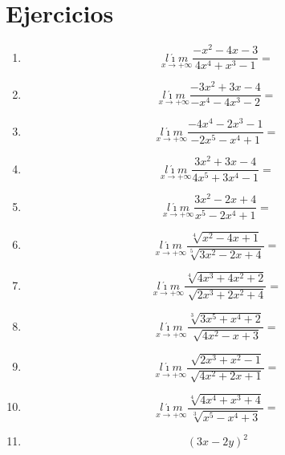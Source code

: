\documentclass[oneside,spanish,letter]{article}
\begin{document}
\section{Ejercicios}
\begin{enumerate}
 \item $$\underset{x\rightarrow +\infty}{l\acute{\imath}m} \frac{-x^2-4x-3}{4x^4+x^3-1}=$$
 \item $$\underset{x\rightarrow +\infty}{l\acute{\imath}m} \frac{-3x^2+3x-4}{-x^4-4x^3-2}=$$
 \item $$\underset{x\rightarrow +\infty}{l\acute{\imath}m} \frac{-4x^4-2x^3-1}{-2x^5-x^4+1}=$$
 \item $$\underset{x\rightarrow +\infty}{l\acute{\imath}m} \frac{3x^2+3x-4}{4x^5+3x^4-1}=$$
 \item $$\underset{x\rightarrow +\infty}{l\acute{\imath}m} \frac{3x^2-2x+4}{x^5-2x^4+1}=$$
 \item $$\underset{x\rightarrow +\infty}{l\acute{\imath}m} \frac{\sqrt[4]{x^2-4x+1}}{\sqrt[5]{3x^2-2x+4}}=$$
 \item $$\underset{x\rightarrow +\infty}{l\acute{\imath}m} \frac{\sqrt[4]{4x^3+4x^2+2}}{\sqrt[]{2x^3+2x^2+4}}=$$
 \item $$\underset{x\rightarrow +\infty}{l\acute{\imath}m} \frac{\sqrt[3]{3x^5+x^4+2}}{\sqrt[]{4x^2-x+3}}=$$
 \item $$\underset{x\rightarrow +\infty}{l\acute{\imath}m} \frac{\sqrt[]{2x^3+x^2-1}}{\sqrt[]{4x^2+2x+1}}=$$
 \item $$\underset{x\rightarrow +\infty}{l\acute{\imath}m} \frac{\sqrt[4]{4x^4+x^3+4}}{\sqrt[3]{x^5-x^4+3}}=$$
\item $$(3x-2y)^2$$
 \end{enumerate}
  \newpage
\end{document}
